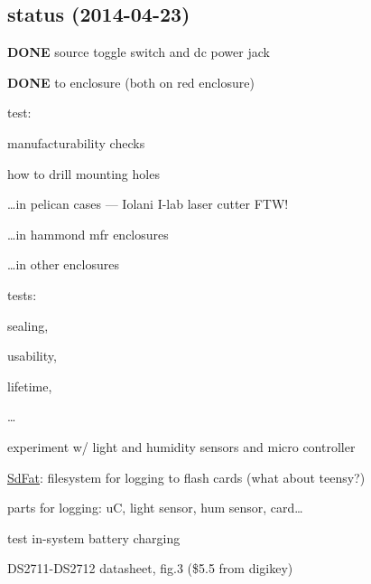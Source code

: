 \documentclass[12pt]{article} %
\begin{document}
\subsection{status (2014-04-23)}
\begin{compactitem}
	\item \textbf{DONE} source toggle switch and dc power jack
	\item \textbf{DONE} to enclosure (both on red enclosure)
	\item test:
	\begin{compactitem}
		\item manufacturability checks
		\begin{compactitem}
			\item how to drill mounting holes
			\item \dots in pelican cases --- 
				Iolani I-lab laser cutter FTW!
			\item \dots in hammond mfr enclosures
			\item \dots in other enclosures
		\end{compactitem}
		\item tests:
		\begin{inparaenum}
			\item sealing, 
			\item usability,
			\item lifetime,
			\item \dots
		\end{inparaenum}
	\end{compactitem}
	\item experiment w/ light and humidity sensors and micro controller
	\begin{compactitem}
		\item \href{https://code.google.com/p/sdfatlib/}{SdFat}: 
			filesystem for logging to flash cards (what about teensy?)
		\item parts for logging: uC, light sensor, hum sensor, card\dots
	\end{compactitem}
	\item test in-system battery charging
	\begin{compactitem}
		\item DS2711-DS2712 datasheet, fig.3 (\$5.5 from digikey)

\end{compactitem}
\end{compactitem}
\end{document}
